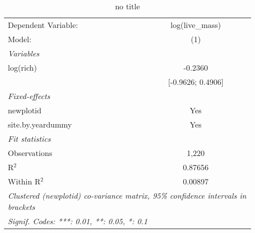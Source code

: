
\begin{table}[htbp]
   \caption{no title}
   \centering
   \begin{tabular}{lc}
      \tabularnewline \midrule \midrule
      Dependent Variable: & log(live\_mass)\\   
      Model:              & (1)\\  
      \midrule
      \emph{Variables}\\
      log(rich)           & -0.2360\\   
                          & [-0.9626; 0.4906]\\   
      \midrule
      \emph{Fixed-effects}\\
      newplotid           & Yes\\  
      site.by.yeardummy   & Yes\\  
      \midrule
      \emph{Fit statistics}\\
      Observations        & 1,220\\  
      R$^2$               & 0.87656\\  
      Within R$^2$        & 0.00897\\  
      \midrule \midrule
      \multicolumn{2}{l}{\emph{Clustered (newplotid) co-variance matrix, 95\% confidence intervals in brackets}}\\
      \multicolumn{2}{l}{\emph{Signif. Codes: ***: 0.01, **: 0.05, *: 0.1}}\\
   \end{tabular}
\end{table}


